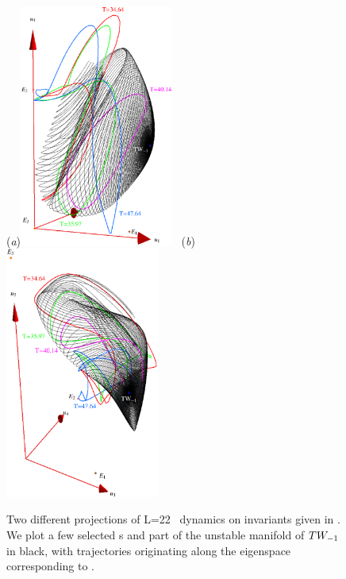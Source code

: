 \begin{figure}[t]
\begin{center}
  (\textit{a})\includegraphics[width=0.45\textwidth, clip=true]{../figs/ks22tw1umInv2}
~(\textit{b})\includegraphics[width=0.45\textwidth, clip= true]{../figs/ks22tw1umInv}
\end{center}
\caption[\KS\  reduced \statesp\ projection, $\REQV{-}{1}$ unstable manifold]
{Two different projections of L=22 \KS\ dynamics on invariants
given in . We plot a few selected {\rpo s} and part of
the unstable manifold of
$\REQV{-}{1}$ in black, with trajectories originating along the eigenspace
corresponding to \eigExp[1].}
\label{fig:TW1red}
\end{figure}

